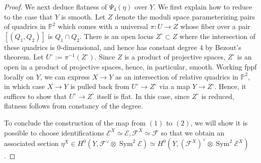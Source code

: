 \documentclass[12 pt]{amsart}
\theoremstyle{plain}
\theoremstyle{definition}
\theoremstyle{remark}
\numberwithin{equation}{section}
\newcommand\bp{\mathbb P}
\newcommand\sce{\mathscr E}
\newcommand\scf{\mathscr F}
\DeclareMathOperator\sym{Sym}
\begin{document}
\begin{proof}
	We next deduce flatness of $\Psi_4(\eta)$ over $Y$.
	We first explain how to reduce to the case that
	$Y$ is smooth. 
	Let $Z$ denote the moduli space parameterizing pairs of quadrics in
	$\bp^2$ which comes with a universal $\pi: U \to Z$ whose fiber over a pair
	$[(Q_1, Q_2)]$ is $Q_1 \cap Q_2$. There is an open locus $Z^\circ
	\subset Z$ where the intersection of these quadrics is $0$-dimensional,
	and hence has constant degree $4$ by Bezout's theorem.
	Let $U^\circ := \pi^{-1}(Z^\circ)$.
	Since $Z$ is a product of projective spaces, $Z^\circ$ is an open in a
	product of projective spaces, hence, in particular, smooth.
	Working fppf locally on $Y$, we can express $X \to Y$ as an intersection
	of relative quadrics in $\bp^2$, in which case
	$X \to Y$ is pulled back from $U^\circ \to Z^\circ$ via a map $Y \to
	Z^\circ$.
	Hence, it suffices to show that $U^\circ \to Z^\circ$ itself is flat.
	In this case, since $Z^\circ$ is reduced,
	flatness follows from constancy of the degree.
		
	To conclude the construction of the map from $(1)$ to $(2)$,
	we will show it is possible to choose identifications
	$\sce^X \simeq \sce, \scf^X \simeq \scf$ so that we obtain an associated
	section $\eta^X \in H^0(Y,\scf^\vee \otimes \sym^2 \sce) \simeq
	H^0(Y,(\scf^X)^\vee \otimes \sym^2 \sce^X)$. 


\end{proof}
\end{document}

